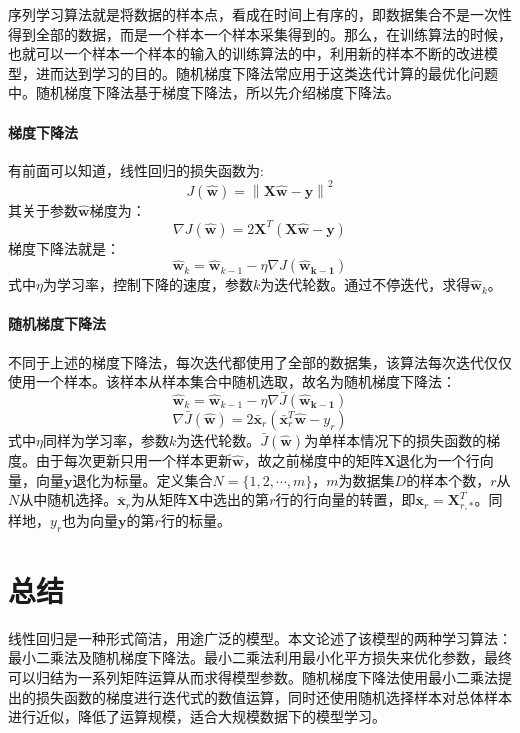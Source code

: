 \documentclass[12pt,a4paper,draft]{ctexart}
\begin{document}
序列学习算法就是将数据的样本点，看成在时间上有序的，即数据集合不是一次性得到全部的数据，而是一个样本一个样本采集得到的。那么，在训练算法的时候，也就可以一个样本一个样本的输入的训练算法的中，利用新的样本不断的改进模型，进而达到学习的目的。随机梯度下降法常应用于这类迭代计算的最优化问题中。随机梯度下降法基于梯度下降法，所以先介绍梯度下降法。

\paragraph{梯度下降法}
有前面可以知道，线性回归的损失函数为:
\[ J(\bm{\hat{w}})=\left \| \bm{X}\bm{\hat{w}}-\bm{y} \right \|^{2} \]
其关于参数$ \bm{\hat{w}} $梯度为：
\[ \nabla J(\bm{\hat{w}})=2\bm{X}^T(\bm{X}\hat{\bm{w}}-\bm{y}) \]
梯度下降法就是：
\[ \bm{\hat{w}}_{k} = \bm{\hat{w}}_{k-1}- \eta \nabla J(\bm{\hat{w}_{k-1}}) \]
式中$\eta$为学习率，控制下降的速度，参数$ k $为迭代轮数。通过不停迭代，求得$ \bm{\hat{w}}_{k} $。
\paragraph{随机梯度下降法}
不同于上述的梯度下降法，每次迭代都使用了全部的数据集，该算法每次迭代仅仅使用一个样本。该样本从样本集合中随机选取，故名为随机梯度下降法：
\[\bm{\hat{w}}_{k} = \bm{\hat{w}}_{k-1}- \eta \nabla\bar{J}(\bm{\hat{w}_{k-1}})\]  
\[\nabla\bar{J}(\bm{\hat{w}})=2 \bar{\bm{x}}_{r}(\bar{\bm{x}}_{r}^T\bm{\hat{w}} - y_{r}) \] 
式中$\eta$同样为学习率，参数$ k $为迭代轮数。$ \bar{J}(\bm{\hat{w}}) $为单样本情况下的损失函数的梯度。由于每次更新只用一个样本更新$ \bm{\hat{w}} $，故之前梯度中的矩阵$ \bm{X} $退化为一个行向量，向量$ \bm{y} $退化为标量。定义集合$ N=\{1,2,\cdots,m\} $，$ m $为数据集$ D $的样本个数，$ r $从$ N $从中随机选择。$ \bar{\bm{x}}_{r} $为从矩阵$ \bm{X} $中选出的第$ r $行的行向量的转置，即$ \bar{\bm{x}}_{r}=\bm{X}_{r,*}^T $。同样地，$ y_{r} $也为向量$ \bm{y} $的第$ r $行的标量。
\section{总结}
线性回归是一种形式简洁，用途广泛的模型。本文论述了该模型的两种学习算法：最小二乘法及随机梯度下降法。最小二乘法利用最小化平方损失来优化参数，最终可以归结为一系列矩阵运算从而求得模型参数。随机梯度下降法使用最小二乘法提出的损失函数的梯度进行迭代式的数值运算，同时还使用随机选择样本对总体样本进行近似，降低了运算规模，适合大规模数据下的模型学习。
\end{document}
